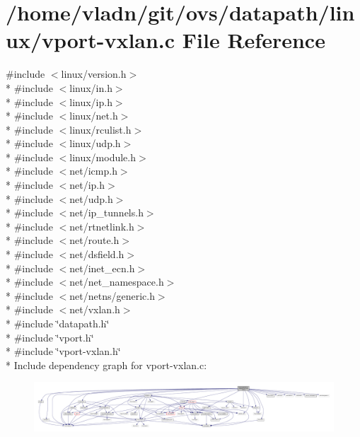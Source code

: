 \hypertarget{linux_2vport-vxlan_8c}{}\section{/home/vladn/git/ovs/datapath/linux/vport-\/vxlan.c File Reference}
\label{linux_2vport-vxlan_8c}
{\ttfamily \#include $<$linux/version.\+h$>$}\\*
{\ttfamily \#include $<$linux/in.\+h$>$}\\*
{\ttfamily \#include $<$linux/ip.\+h$>$}\\*
{\ttfamily \#include $<$linux/net.\+h$>$}\\*
{\ttfamily \#include $<$linux/rculist.\+h$>$}\\*
{\ttfamily \#include $<$linux/udp.\+h$>$}\\*
{\ttfamily \#include $<$linux/module.\+h$>$}\\*
{\ttfamily \#include $<$net/icmp.\+h$>$}\\*
{\ttfamily \#include $<$net/ip.\+h$>$}\\*
{\ttfamily \#include $<$net/udp.\+h$>$}\\*
{\ttfamily \#include $<$net/ip\+\_\+tunnels.\+h$>$}\\*
{\ttfamily \#include $<$net/rtnetlink.\+h$>$}\\*
{\ttfamily \#include $<$net/route.\+h$>$}\\*
{\ttfamily \#include $<$net/dsfield.\+h$>$}\\*
{\ttfamily \#include $<$net/inet\+\_\+ecn.\+h$>$}\\*
{\ttfamily \#include $<$net/net\+\_\+namespace.\+h$>$}\\*
{\ttfamily \#include $<$net/netns/generic.\+h$>$}\\*
{\ttfamily \#include $<$net/vxlan.\+h$>$}\\*
{\ttfamily \#include \char`\"{}datapath.\+h\char`\"{}}\\*
{\ttfamily \#include \char`\"{}vport.\+h\char`\"{}}\\*
{\ttfamily \#include \char`\"{}vport-\/vxlan.\+h\char`\"{}}\\*
Include dependency graph for vport-\/vxlan.c\+:
\nopagebreak
\begin{figure}[H]
\begin{center}
\leavevmode
\includegraphics[width=350pt]{linux_2vport-vxlan_8c__incl}
\end{center}
\end{figure}

